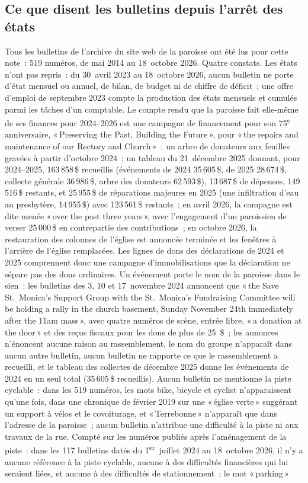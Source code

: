 \documentclass[11pt,letterpaper]{article}
\newcommand{\D}[1]{#1\,\$}
\begin{document}
\subsection{Ce que disent les bulletins depuis l'arrêt des états}

Tous les bulletins de l'archive du site web de la paroisse ont été lus pour cette note~: 519 numéros, de mai 2014 au 18~octobre 2026. Quatre constats. Les états n'ont pas repris~: du 30~avril 2023 au 18~octobre 2026, aucun bulletin ne porte d'état mensuel ou annuel, de bilan, de budget ni de chiffre de déficit~; une offre d'emploi de septembre 2023 compte la production des états mensuels et cumulés parmi les tâches d'un comptable. Le compte rendu que la paroisse fait elle-même de ses finances pour 2024--2026 est une campagne de financement pour son 75\textsuperscript{e} anniversaire, «\,Preserving the Past, Building the Future\,», pour «\,the repairs and maintenance of our Rectory and Church\,»~: un arbre de donateurs aux feuilles gravées à partir d'octobre 2024~; un tableau du 21~décembre 2025 donnant, pour 2024--2025, \D{163\,858} recueillis (événements de 2024 \D{35\,605}, de 2025 \D{28\,674}, collecte générale \D{36\,986}, arbre des donateurs \D{62\,593}), \D{13\,687} de dépenses, \D{149\,516} restants, et \D{25\,955} de réparations majeures en 2025 (une infiltration d'eau au presbytère, \D{14\,955}) avec \D{123\,561} restants~; en avril 2026, la campagne est dite menée «\,over the past three years\,», avec l'engagement d'un paroissien de verser \D{25\,000} en contrepartie des contributions~; en octobre 2026, la restauration des colonnes de l'église est annoncée terminée et les fenêtres à l'arrière de l'église remplacées. Les lignes de dons des déclarations de 2024 et 2025 comprennent donc une campagne d'immobilisations que la déclaration ne sépare pas des dons ordinaires. Un événement porte le nom de la paroisse dans le sien~: les bulletins des 3, 10 et 17~novembre 2024 annoncent que «\,the Save St.~Monica's Support Group with the St.~Monica's Fundraising Committee will be holding a rally in the church basement, Sunday November 24th immediately after the 11am mass\,», avec quatre numéros de scène, entrée libre, «\,a donation at the door\,» et des reçus fiscaux pour les dons de plus de 25~\$~; les annonces n'énoncent aucune raison au rassemblement, le nom du groupe n'apparaît dans aucun autre bulletin, aucun bulletin ne rapporte ce que le rassemblement a recueilli, et le tableau des collectes de décembre 2025 donne les événements de 2024 en un seul total (\D{35\,605} recueillis). Aucun bulletin ne mentionne la piste cyclable~: dans les 519 numéros, les mots bike, bicycle et cyclist n'apparaissent qu'une fois, dans une chronique de février 2019 sur une «\,église verte\,» suggérant un support à vélos et le covoiturage, et «\,Terrebonne\,» n'apparaît que dans l'adresse de la paroisse~; aucun bulletin n'attribue une difficulté à la piste ni aux travaux de la rue. Compté sur les numéros publiés après l'aménagement de la piste~: dans les 117 bulletins datés du 1\textsuperscript{er}~juillet 2024 au 18~octobre 2026, il n'y a aucune référence à la piste cyclable, aucune à des difficultés financières qui lui seraient liées, et aucune à des difficultés de stationnement~; le mot «\,parking\,» 
\end{document}
